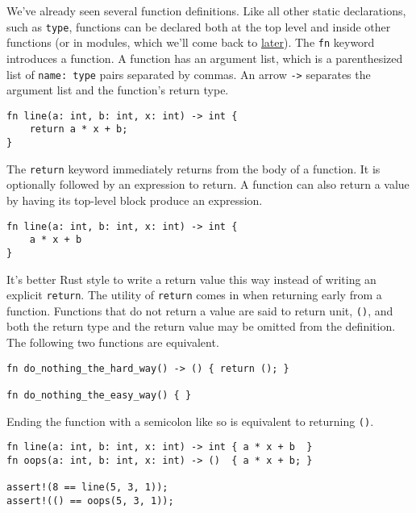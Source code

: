 \documentclass[]{article}
\begin{document}

We've already seen several function definitions. Like all other static
declarations, such as \texttt{type}, functions can be declared both at
the top level and inside other functions (or in modules, which we'll
come back to \hyperref[crates-and-the-module-system]{later}). The
\texttt{fn} keyword introduces a function. A function has an argument
list, which is a parenthesized list of \texttt{name: type} pairs
separated by commas. An arrow \texttt{-\textgreater{}} separates the
argument list and the function's return type.

\begin{verbatim}
fn line(a: int, b: int, x: int) -> int {
    return a * x + b;
}
\end{verbatim}

The \texttt{return} keyword immediately returns from the body of a
function. It is optionally followed by an expression to return. A
function can also return a value by having its top-level block produce
an expression.

\begin{verbatim}
fn line(a: int, b: int, x: int) -> int {
    a * x + b
}
\end{verbatim}

It's better Rust style to write a return value this way instead of
writing an explicit \texttt{return}. The utility of \texttt{return}
comes in when returning early from a function. Functions that do not
return a value are said to return unit, \texttt{()}, and both the return
type and the return value may be omitted from the definition. The
following two functions are equivalent.

\begin{verbatim}
fn do_nothing_the_hard_way() -> () { return (); }

fn do_nothing_the_easy_way() { }
\end{verbatim}

Ending the function with a semicolon like so is equivalent to returning
\texttt{()}.

\begin{verbatim}
fn line(a: int, b: int, x: int) -> int { a * x + b  }
fn oops(a: int, b: int, x: int) -> ()  { a * x + b; }

assert!(8 == line(5, 3, 1));
assert!(() == oops(5, 3, 1));
\end{verbatim}
\end{document}
